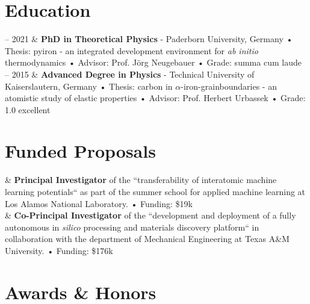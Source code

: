 \documentclass[11pt, a4paper]{article}
\newcommand{\TUKL}{Technical University of Kaiserslautern}
\newcommand{\Duration}[2]{\fontsize{10pt}{0}\selectfont #1 -- #2}
\newcommand{\Year}[1]{\fontsize{10pt}{0}\selectfont #1}
\begin{document}
\section{Education}

\begin{EntriesTable}
  \Duration{2015}{2021}  &
  \textbf{PhD in Theoretical Physics} - Paderborn University, Germany \newline
   • Thesis: pyiron - an integrated development environment for \textit{ab initio} thermodynamics \newline
   • Advisor: Prof. J\"org Neugebauer\newline
   • Grade: summa cum laude
  \\
  \Duration{2009}{2015}  &
  \textbf{Advanced Degree in Physics} - \TUKL, Germany \newline
   • Thesis: carbon in $\alpha$-iron-grainboundaries - an atomistic study of elastic properties\newline
   • Advisor: Prof. Herbert Urbassek\newline
   • Grade: 1.0 excellent
\end{EntriesTable}

\section{Funded Proposals}
\begin{EntriesTable}
\Year{2022} &
  \textbf{Principal Investigator} of the ``transferability of interatomic machine learning potentials`` as part of the summer school for applied machine learning at Los Alamos National Laboratory.
  \newline • Funding: \$19k 
  \\ &
  \textbf{Co-Principal Investigator} of the ``development and deployment of a fully autonomous in \textit{silico} processing and materials discovery platform`` in collaboration with the department of Mechanical Engineering at Texas A\&M University.
  \newline • Funding: \$176k 
\end{EntriesTable}

\section{Awards \& Honors}
\end{document}
